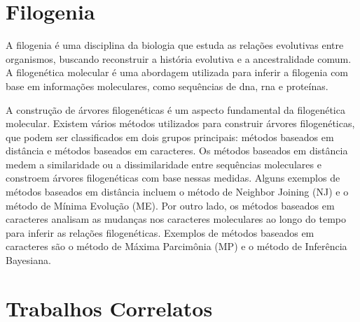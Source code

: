 \section{Filogenia}

A filogenia é uma disciplina da biologia que estuda as relações evolutivas entre organismos, buscando reconstruir a história evolutiva e a ancestralidade comum. A filogenética molecular é uma abordagem utilizada para inferir a filogenia com base em informações moleculares, como sequências de \gls{dna}, \gls{rna} e proteínas\cite{felsenstein_inferring_2004}.

A construção de árvores filogenéticas é um aspecto fundamental da filogenética molecular. Existem vários métodos utilizados para construir árvores filogenéticas, que podem ser classificados em dois grupos principais: métodos baseados em distância e métodos baseados em caracteres.
Os métodos baseados em distância medem a similaridade ou a dissimilaridade entre sequências moleculares e constroem árvores filogenéticas com base nessas medidas. Alguns exemplos de métodos baseados em distância incluem o método de Neighbor Joining (NJ) e o método de Mínima Evolução (ME).
Por outro lado, os métodos baseados em caracteres analisam as mudanças nos caracteres moleculares ao longo do tempo para inferir as relações filogenéticas. Exemplos de métodos baseados em caracteres são o método de Máxima Parcimônia (MP) e o método de Inferência Bayesiana\cite{swofford_phylogenetic_1996}.






\section{Trabalhos Correlatos}


